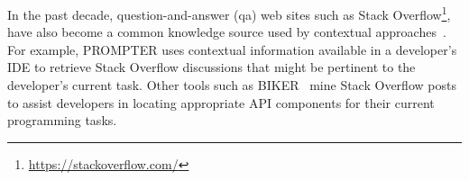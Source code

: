 In the past decade, question-and-answer (\acs{qa}) web sites such as Stack Overflow\footnote{\url{https://stackoverflow.com/}}, have also
become a common knowledge source used by contextual approaches~\cite{Ponzanelli2013b, Ponzanelli2014b, Treude2016, delfim2016}.
For example, {\small PROMPTER} uses contextual information 
available in a developer's IDE to retrieve Stack Overflow discussions that might be pertinent 
to the developer's current task. Other tools such as {\small BIKER}~\cite{Huang2018} mine Stack Overflow posts to assist developers in locating appropriate API components for their current programming tasks. 





